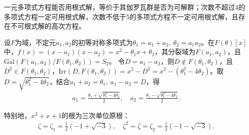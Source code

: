 \documentclass[../../main.tex]{subfiles}%
\begin{document}
\begin{remark}
一元多项式方程能否用根式解，等价于其伽罗瓦群是否为可解群；次数不超过4的多项式方程一定可用根式解，次数不低于5的多项式方程不一定可用根式解，且存在不可根式解的高次方程。
\end{remark}

\begin{example}
设$F$为域，不定元$a_1,a_2$的初等对称多项式为$\theta_1=a_1+a_2,\ \theta_2=a_1a_2$。在$F(\theta)[x]$中，$f(x)=(x-a_1)(x-a_2)=x^2-\theta_1x+\theta_2$，其分裂域为$F(a_1,a_2)$，且$\mathrm{Gal}(F(a_1,a_2)/F(\theta_1,\theta_2))=S_2$。
令$D=a_1-a_2$，则$D\notin F(\theta_1,\theta_2)$，且$D^2\in F(\theta_1,\theta_2)$，$\mathrm{Irr}(D,F(\theta_1,\theta_2))=x^2-D^2=x^2-(\theta_1^2-4\theta_2)$。取$D=\sqrt{\theta_1^2-4\theta_2}$，结合$a_1+a_2=\theta_1,\ a_1-a_2=D$，得
\begin{align*}
a_1=\frac{\theta_1+\sqrt{\theta_1^2-4\theta_2}}{2},\quad a_2=\frac{\theta_1-\sqrt{\theta_1^2-4\theta_2}}{2}.
\end{align*}

特别地，$x^2+x+1$的根为三次单位原根：
\begin{align*}
\zeta=\zeta_1=\frac{1}{2}(-1+\sqrt{-3}),\quad \zeta^2=\overline{\zeta}=\zeta_2=\frac{1}{2}(-1-\sqrt{-3}).
\end{align*}
\end{example}
\end{document}
